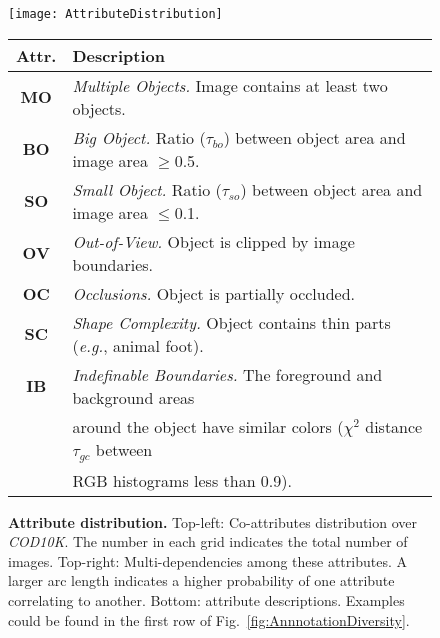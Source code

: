 \documentclass[10pt,journal,compsoc]{IEEEtran}
\def\eg{\emph{e.g.}}
\newcommand{\figref}[1]{Fig.~\ref{#1}}
\newcommand{\fdp}[1]{\textbf{\textcolor{red}{#1}}}
\def\ourdataset{\textit{COD10K}}
\begin{document}
\begin{figure}[t!]
  \centering
  \texttt{[image: AttributeDistribution]}\\
  \vspace{4pt}
  \footnotesize
  \renewcommand{\arraystretch}{0.9}
 \begin{tabular*}{\linewidth}{cl} \hline \toprule
  Attr. & Description\\
  \midrule
  \textbf{MO} & \emph{Multiple Objects.} Image contains at least two objects.\\
  \textbf{BO} & \emph{Big Object.} Ratio ($\tau_{bo}$) between object area 
                and image area $\geq$0.5.\\
  \textbf{SO} & \emph{Small Object.} Ratio ($\tau_{so}$) between object area 
                and image area $\leq$0.1.\\
  \textbf{OV} & \emph{Out-of-View.} Object is clipped by image boundaries.\\
  \textbf{OC} & \emph{Occlusions.} Object is partially occluded.\\
  \textbf{SC} & \emph{Shape Complexity.} Object contains thin parts 
                (\eg, animal foot).\\
  \textbf{IB} & \emph{Indefinable Boundaries.} 
                The foreground and background areas\\
              & around the object have similar colors ($\chi^2$ distance 
                $\tau_{gc}$ between\\
              & RGB histograms less than 0.9).\\
  \hline \toprule
 \end{tabular*}
  \vspace{-8pt}
  \caption{\textbf{Attribute distribution.}
    Top-left: Co-attributes distribution over \ourdataset. 
    The number in each grid indicates the total number of images.
    Top-right: Multi-dependencies among these attributes.
    A larger arc length indicates a higher probability of one attribute 
    correlating to another.
    Bottom: attribute descriptions. 
    Examples could be found in the first row of 
    \figref{fig:AnnnotationDiversity}.
  }\label{fig:attributeDistribution}
\end{figure}
\end{document}
